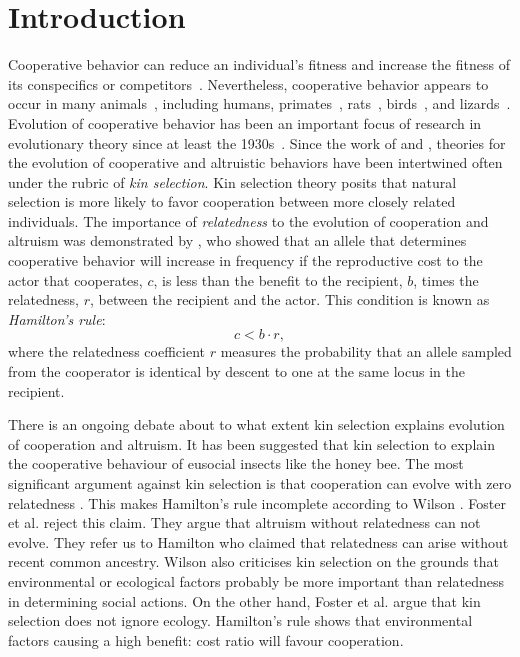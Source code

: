 \documentclass[12pt]{extarticle}
\begin{document}
\section{Introduction}
Cooperative behavior can reduce an individual's fitness and increase the fitness of its conspecifics or competitors~\citep{axelrod1981evolution}.
Nevertheless, cooperative behavior appears to occur in many animals~\citep{dugatkin1997cooperation}, including humans, primates~\citep{jaeggi2013natural},  rats~\citep{rice1962altruism}, birds~\citep{stacey1990cooperative,krams2008experimental}, and lizards~\citep{sinervo2006self}.
Evolution of cooperative behavior has been an important focus of research in evolutionary theory since at least the 1930s~\citep{Haldane1932book}.
Since the work of  \citet{hamilton1964genetical} and \citet{axelrod1981evolution}, theories for the evolution of cooperative and altruistic behaviors have been intertwined often under the rubric of \emph{kin selection}.
Kin selection theory posits that natural selection is more likely to favor cooperation between more closely related individuals.
The importance of \emph{relatedness} to the evolution of cooperation and altruism was demonstrated by \citet{hamilton1964genetical}, who showed that an allele that determines cooperative behavior will increase in frequency if the reproductive cost to the actor that cooperates, $c$, is less than the benefit to the recipient, $b$, times the relatedness, $r$, between the recipient and the actor.
This condition is  known as \emph{Hamilton's rule}:
\begin{equation} \label{eq:hamilton_rule}
c < b \cdot r,
\end{equation}
where the relatedness coefficient $r$ measures the probability that an allele sampled from the cooperator is identical by descent to one at the same locus in the recipient.

There is an ongoing debate about to what extent kin selection explains evolution of cooperation and altruism.
It has been suggested that kin selection to explain the cooperative behaviour of eusocial insects like the honey bee.
The most significant argument against kin selection is that cooperation can evolve with zero relatedness \cite{wilson2005kin}. This makes Hamilton's rule incomplete according to Wilson \cite{wilson2005kin}. Foster et al. \cite{foster2006kin} reject this claim. 
They argue that altruism without relatedness can not evolve. They refer us to Hamilton who claimed that relatedness can arise without recent common ancestry. 
Wilson also criticises kin selection on the grounds that environmental or ecological factors probably be more important than relatedness in determining social actions. On the other hand, Foster et al. \cite{foster2006kin} argue that kin selection does not ignore ecology. 
Hamilton’s rule shows that environmental factors causing a high benefit: cost ratio will favour cooperation.
\end{document}
